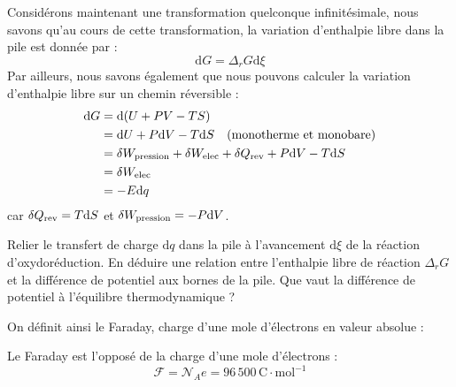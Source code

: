 \documentclass[11pt,fleqn]{book} %
\newcommand{\dd}{\mathrm{d}}
\begin{document}
Considérons maintenant une transformation quelconque infinitésimale, nous savons qu'au cours de cette transformation, la variation d'enthalpie libre dans la pile est donnée par :
\begin{equation}
	\dd G = \Delta_r G \dd \xi
\end{equation}
Par ailleurs, nous savons également que nous pouvons calculer la variation d'enthalpie libre sur un chemin réversible :
\begin{align}
	\dd G &= \dd (U + PV - TS) \\
	&= \dd U + P \dd V - T \dd S \quad \mathrm{(monotherme\,\,et\,\,monobare)} \\
	&= \delta W_{\rm pression} + \delta W_{\rm elec} + \delta Q_{\rm rev} + P \dd V - T \dd S \\
	&= \delta W_{\rm elec} \\
	&= -E \dd q
\end{align}
car $\delta Q_{\rm rev} = T \dd S$ et $\delta W_{\rm pression} = - P \dd V$.

\begin{capex}
	Relier le transfert de charge $\dd q$ dans la pile à l'avancement $\dd \xi$ de la réaction d'oxydoréduction. En déduire une relation entre l'enthalpie libre de réaction $\Delta_r G$ et la différence de potentiel aux bornes de la pile. Que vaut la différence de potentiel à l'équilibre thermodynamique ?
\end{capex}

On définit ainsi le Faraday, charge d'une mole d'électrons en valeur absolue :
\begin{definition}[Faraday]
	Le Faraday est l'opposé de la charge d'une mole d'électrons :
	\begin{equation}
		\mathcal{F} = \mathcal{N}_A e = 96\,500\,\mathrm{C}\cdot\mathrm{mol}^{-1}
	\end{equation}
\end{definition}
\end{document}
